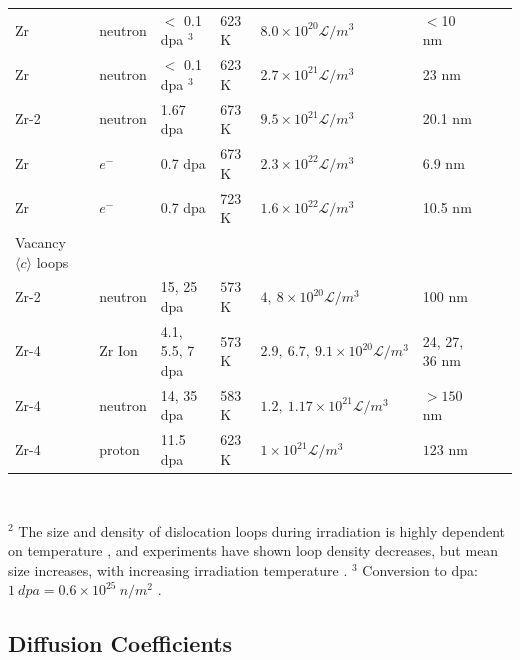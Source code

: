 \documentclass[12pt]{article}
\begin{document}
\begin{table}[t]
{\begin{tabular}{llllllll}
      Zr & neutron & $<$ 0.1 dpa $^3$ & 623 K & $8.0 \times 10^{20} \si{\mathcal{L}/m^3}$ & $<$10 nm & \cite{jostsons1977nature} \\
      Zr & neutron & $<$ 0.1 dpa $^3$ & 623 K & $2.7 \times 10^{21} \si{\mathcal{L}/m^3}$ & 23 nm & \cite{jostsons1977nature} \\
      Zr-2 & neutron &  1.67 dpa & 673 K & $9.5 \times 10^{21} \si{\mathcal{L}/m^3}$ & 20.1 nm & \cite{northwood1979characterization} \\
      Zr & $e^-$ & 0.7 dpa & 673 K & $2.3 \times 10^{22} \si{\mathcal{L}/m^3}$ & 6.9 nm & \cite{hellio1988influence} \\
      Zr & $e^-$ & 0.7 dpa & 723 K & $1.6 \times 10^{22} \si{\mathcal{L}/m^3}$ & 10.5 nm & \cite{hellio1988influence} \\
    \hline
    Vacancy $\langle c\rangle$ loops \\
    \hline
      Zr-2 & neutron & 15, 25 dpa & $573$ K & $4,~8 \times 10^{20} \si{\mathcal{L}/m^3}$ & 100 nm & \cite{harte2017effect} \\
      Zr-4 & Zr Ion &  4.1, 5.5, 7 dpa & 573 K & $2.9,~6.7,~9.1 \times 10^{20} \si{\mathcal{L}/m^3}$ & 24, 27, 36 nm & \cite{tournadre2012experimental} \\
      Zr-4 & neutron &  14, 35 dpa & 583 K & $1.2,~1.17 \times 10^{21} \si{\mathcal{L}/m^3}$ & $>150$ nm & \cite{tournadre2012experimental} \\
      Zr-4 & proton & 11.5 dpa & 623 K & $1 \times 10^{21} \si{\mathcal{L}/m^3}$ & $123$ nm & \cite{tournadre2012experimental} \\
   \hline \hline
    \end{tabular}}
    \label{tab:loopdata} \\
\raggedright
\footnotesize{$^2$ The size and density of dislocation loops during irradiation is highly dependent on temperature
\cite{adamson_irradiation_2019}, and experiments have shown loop density decreases, but mean size increases, with increasing irradiation temperature
\cite{hellio1988influence, gaume2017microstructure, gilbert1979damage}.}
\footnotesize{$^3$ Conversion to dpa: $1~\si{dpa} = 0.6\times10^{25}~\si{n/m^2}$ \cite{carpenter1981irradiation,adamson_irradiation_2019}.}
\end{table} 


\newpage
\subsection{Diffusion Coefficients}
\end{document}
